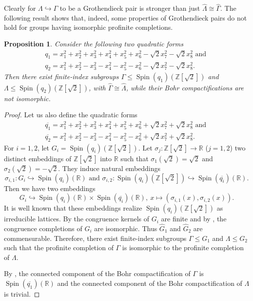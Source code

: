 \documentclass{amsart}
\newtheorem{pro}[lem]{Proposition}
\theoremstyle{definition}
\theoremstyle{remark}
\DeclareMathOperator{\Spin}{Spin}
\newcommand{\R}{\mathbb{R}}
\newcommand{\Z}{\mathbb{Z}}
\begin{document}
Clearly for $\Lambda \hookrightarrow \Gamma$ to be a Grothendieck pair is stronger than just $\widehat \Lambda \cong \widehat \Gamma$. 
The following result shows that, indeed, some properties of Grothendieck pairs do not hold for groups having isomorphic profinite completions.
\begin{pro}\label{orth}
Consider the following two quadratic forms
\begin{multline*}
q_1= x_1^2+x_2^2+x_3^2+x_4^2+x_5^2+x_6^2-\sqrt 2 x_7^2-\sqrt 2 x_8^2 \textrm{\ and\ }\\ q_2=x_1^2+x_2^2-x_3^2-x_4^2-x_5^2- x_6^2-\sqrt 2 x_7^2-\sqrt 2 x_8^2.\end{multline*}
  Then there exist finite-index subgroups $\Gamma \le \Spin(q_1)(\Z[\sqrt 2])$ and $\Lambda  \le \Spin(q_2)(\Z[\sqrt 2]) $, with  $ \widehat \Gamma  \cong \widehat \Lambda$,  while their Bohr compactifications are not isomorphic.
\end{pro}



\begin{proof}Let us also define the quadratic forms
\begin{multline*}
\overline{q_1}= x_1^2+x_2^2+x_3^2+x_4^2+x_5^2+x_6^2+\sqrt 2 x_7^2+\sqrt 2 x_8^2 \textrm{\ and\ }\\ \overline{q_2}=x_1^2+x_2^2-x_3^2-x_4^2-x_5^2- x_6^2+\sqrt 2 x_7^2+\sqrt 2 x_8^2.\end{multline*}
For $i=1,2$, let  $G_i= \Spin(q_i)(\Z[\sqrt 2])$.
Let $\sigma_j:\Z[\sqrt 2]\to \R$ ($j=1,2$) two distinct
embeddings of   $\Z[\sqrt 2]$ into $\R$ such that $\sigma_1(\sqrt 2)=\sqrt 2$ and $\sigma_2(\sqrt 2)=-\sqrt 2$. They induce natural embeddings $$\sigma_{i,1}: G_i \hookrightarrow  \Spin(q_i)(\R)\textrm{\ and\ } \sigma_{i,2}: \Spin(q_i)(\Z[\sqrt 2]) \hookrightarrow \Spin(\overline{q_i})(\R).$$
Then we have two embeddings
$$ G_i\hookrightarrow  \Spin(q_i)(\R)\times   \Spin(\overline{q_i})(\R), \ x\mapsto(\sigma_{i,1}(x),\sigma_{i,2}(x)).$$
It is well known that these embeddings realize $\Spin(q_i)(\Z[\sqrt 2])$ as irreducible lattices.
By \cite[11.1]{Kn79} the congruence kernels of $G_i$ are finite and by \cite[Corollary 4]{Ak12}, the congruence completions of $G_i$ are isomorphic. Thus $\widehat G_1$ and $\widehat G_2$ are commensurable. Therefore,  there exist finite-index subgroups $\Gamma \le G_1$ and $\Lambda  \le G_2$
such that the profinite completion of $\Gamma$ is isomorphic to the profinite completion of $\Lambda$.

By \cite[Theorem 3]{Be23}, the connected component of the Bohr compactification of $\Gamma$ is $ \Spin(\overline{q_1})(\R)$ and  the connected component of the Bohr compactification of $\Lambda$ is trivial. \end{proof}
\end{document}
